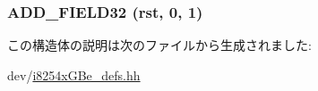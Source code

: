 \label{structiGbReg_1_1Regs_1_1TCTL_a0d3ee24d460c2635ff314d3fefeb246c}
\hypertarget{structiGbReg_1_1Regs_1_1TCTL_a0dc106893a41122c327230f9290f08cb}{
\subsubsection[{ADD\_\-FIELD32}]{\setlength{\rightskip}{0pt plus 5cm}ADD\_\-FIELD32 (rst, \/  0, \/  1)}}
\label{structiGbReg_1_1Regs_1_1TCTL_a0dc106893a41122c327230f9290f08cb}


この構造体の説明は次のファイルから生成されました:\begin{DoxyCompactItemize}
\item 
dev/\hyperlink{i8254xGBe__defs_8hh}{i8254xGBe\_\-defs.hh}\end{DoxyCompactItemize}
